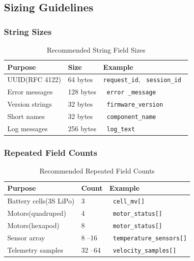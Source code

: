 \subsection{Sizing Guidelines}

\subsubsection{String Sizes}

\begin{table}[H]
\centering
\caption{Recommended String Field Sizes}
\label{tab:string-sizes}
\begin{tabular} { | l | l | l |}
\hline
\textbf{Purpose} & \textbf{Size} & \textbf{Example}
\\
\hline UUID(RFC 4122) & 64 bytes & \texttt{request\_id}, \texttt {
  session\_id
}
\\
\hline Error messages & 128 bytes & \texttt { error \_message}
\\
\hline Version strings & 32 bytes & \texttt { firmware\_version}
\\
\hline Short names & 32 bytes & \texttt { component\_name}
\\
\hline Log messages & 256 bytes & \texttt { log\_text}
\\
\hline
\end{tabular}
\end{table}

\subsubsection{Repeated Field Counts}

\begin{table}[H]
\centering
\caption{Recommended Repeated Field Counts}
\label{tab:repeated-counts}
\begin{tabular} { | l | l | l |}
\hline
\textbf{Purpose} & \textbf{Count} & \textbf{Example}
\\
\hline Battery cells(3S LiPo) & 3 & \texttt { cell\_mv[]}
\\
\hline Motors(quadruped) & 4 & \texttt { motor\_status[]}
\\
\hline Motors(hexapod) & 8 & \texttt { motor\_status[]}
\\
\hline Sensor array & 8 --16 & \texttt { temperature\_sensors[]}
\\
\hline Telemetry samples & 32 --64 & \texttt { velocity\_samples[]}
\\
\hline
\end{tabular}
\end{table}


